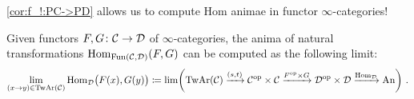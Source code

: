\cref{cor:f_!:PC->PD} allows us to compute Hom animae in functor $\infty$-categories!
\begin{cor}\label{cor:HomInFunctorCats}
	Given functors $F,G\colon \mathcal{C}\rightarrow\mathcal{D}$ of $\infty$-categories, the anima of natural transformations $\operatorname{Hom}_{\operatorname{Fun}(\mathcal{C},\mathcal{D})}\!\left(F,G\right)$ can be computed as the following limit:
	\begin{equation*}
		\limit_{(x\rightarrow y)\in\TwAr(\Cc)}\Hom_\Dd\lef(F(x),G(y)\righ)\coloneqq \limit\!\left(\TwAr(\Cc)\xrightarrow{\!(s,t)\!}\Cc^\op\times\Cc\xrightarrow{\!F^\op\times G\!}\Dd^\op\times\Dd\xrightarrow{\!\Hom_\Dd\!}\cat{An}\right)\,.
	\end{equation*}
\end{cor}
